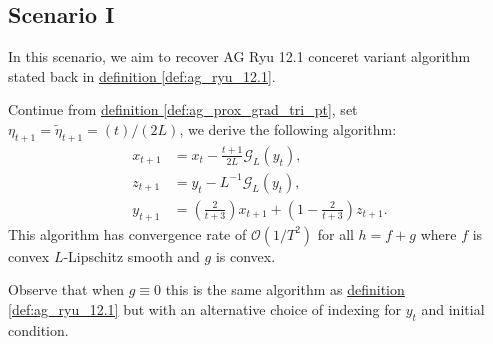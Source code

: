 \documentclass[12pt]{article}
\begin{document}
    \subsection{Scenario I}\label{sec:scenario_i}
        In this scenario, we aim to recover AG Ryu 12.1 conceret variant algorithm stated back in 
        \hyperref[def:ag_ryu_12.1]{definition \ref*{def:ag_ryu_12.1}}. 
        \begin{proposition}
            Continue from
            \hyperref[def:ag_prox_grad_tri_pt]{definition \ref*{def:ag_prox_grad_tri_pt}}, 
            set $\eta_{t + 1} = \tilde \eta_{t + 1} = (t)/(2L)$, we derive the following algorithm: 
            \begin{align*}
                x_{t + 1} &= x_t - \frac{t + 1}{2L} \mathcal G_L(y_t), 
                \\
                z_{t + 1} &= y_t - L^{-1} \mathcal G_L(y_t), 
                \\
                y_{t + 1} &= 
                \left(
                    \frac{2}{t + 3}
                \right)x_{t +1} + 
                \left(
                    1 - \frac{2}{t + 3}
                \right)z_{t + 1}. 
            \end{align*}
            This algorithm has convergence rate of $\mathcal O(1/T^2)$ for all $h = f + g$ where $f$ is convex $L$-Lipschitz smooth and $g$ is convex. 
        \end{proposition}
        \begin{observation}
            Observe that when $g \equiv 0$ this is the same algorithm as 
            \hyperref[def:ag_ryu_12.1]{definition \ref*{def:ag_ryu_12.1}}
            but with an alternative choice of indexing for $y_t$ and initial condition. 
        \end{observation}
\end{document}

